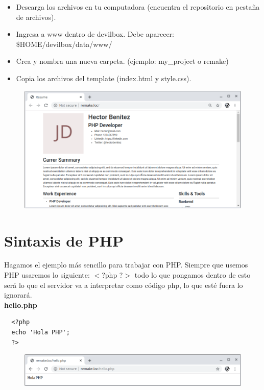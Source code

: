 \documentclass{article}
\begin{document}
\begin{itemize}
  \item Descarga los archivos en tu computadora (encuentra el repositorio en
    pestaña de archivos).
  \item Ingresa a www dentro de devilbox. Debe aparecer:
    \$HOME/devilbox/data/www/
  \item Crea y nombra una nueva carpeta. (ejemplo: my\_project o remake)
  \item Copia los archivos del template (index.html y style.css).
\end{itemize}

\newpage

\begin{figure}[h!]
  \centering
  \includegraphics[scale=0.5]{./Pictures/008_template.png}
\end{figure}

\section{Sintaxis de PHP}%
Hagamos el ejemplo más sencillo para trabajar con PHP. Siempre que usemos PHP
usaremos lo siguiente: $<$?php ?$>$ todo lo que pongamos dentro de esto será lo
que el servidor va a interpretar como código php, lo que esté fuera lo
ignorará.\\

\textbf{hello.php}\\
\begin{verbatim}
  <?php
  echo 'Hola PHP';
  ?>
\end{verbatim}

\begin{figure}[h!]
  \centering
  \includegraphics[scale=0.75]{./Pictures/009_hellophp.png}
\end{figure}
\end{document}
